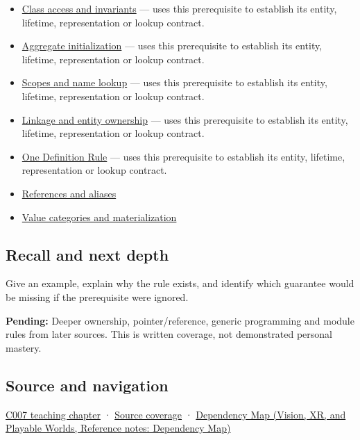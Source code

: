 \begin{itemize}
\tightlist
\item
  \hyperref[appendix-8e5214819615]{Class access and invariants} --- uses this prerequisite to establish its entity, lifetime, representation or lookup contract.
\item
  \hyperref[appendix-b7174c179542]{Aggregate initialization} --- uses this prerequisite to establish its entity, lifetime, representation or lookup contract.
\item
  \hyperref[appendix-b12b31759da1]{Scopes and name lookup} --- uses this prerequisite to establish its entity, lifetime, representation or lookup contract.
\item
  \hyperref[appendix-74a0ec818c18]{Linkage and entity ownership} --- uses this prerequisite to establish its entity, lifetime, representation or lookup contract.
\item
  \hyperref[appendix-49d27bc9d9a5]{One Definition Rule} --- uses this prerequisite to establish its entity, lifetime, representation or lookup contract.
\item
  \hyperref[appendix-d6d562ca9fbb]{References and aliases}
\item
  \hyperref[appendix-1121b30eaeb0]{Value categories and materialization}
\end{itemize}

\subsection{Recall and next depth}\label{appendix-2e4d494c2d94-recall-and-next-depth}

Give an example, explain why the rule exists, and identify which guarantee would be missing if the prerequisite were ignored.

\textbf{Pending:} Deeper ownership, pointer/reference, generic programming and module rules from later sources. This is written coverage, not demonstrated personal mastery.

\subsection{Source and navigation}\label{appendix-2e4d494c2d94-source-and-navigation}

\hyperref[01-foundations-i-ch002-promises-become-definitions]{C007 teaching chapter} · \hyperref[appendix-fd090d982a15-m007---parts-101-112]{Source coverage} · \href{../07-Vision-XR-and-Playable-Worlds/main.pdf\#nameddest=appendix-4ad47bdd269a}{Dependency Map (Vision, XR, and Playable Worlds, Reference notes: Dependency Map)}

